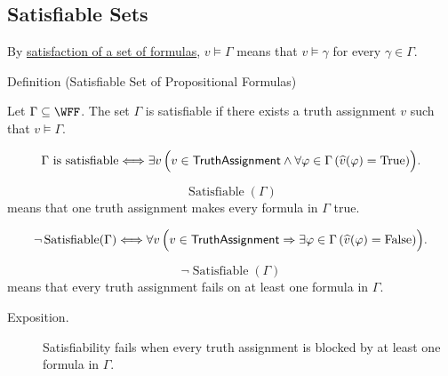 \subsection*{Satisfiable Sets}

\begin{remark*}[Recall]
By \hyperref[def:satisfaction-set-propositional-logic]{satisfaction of a set of
formulas}, \(v\models\Gamma\) means that \(v\models\gamma\) for every
\(\gamma\in\Gamma\).
\end{remark*}

\begin{definitionbox}{Definition (Satisfiable Set of Propositional Formulas)}
\begin{definition}
\label{def:satisfiable-set-of-propositional-formulas}
Let \(\Gamma\subseteq\WFF\). The set \(\Gamma\) is satisfiable if there exists a
truth assignment \(v\) such that \(v\models\Gamma\).
\end{definition}
\end{definitionbox}

\begin{remark*}
\[
\Gamma\text{ is satisfiable}
\Longleftrightarrow
\exists v\,\Bigl(v\in\mathsf{TruthAssignment}\land
\forall\varphi\in\Gamma\,(\widehat v(\varphi)=\mathrm{True})\Bigr).
\]
\end{remark*}

\begin{remark*}
\[
\operatorname{Satisfiable}(\Gamma)
\]
means that one truth assignment makes every formula in \(\Gamma\) true.
\end{remark*}

\begin{remark*}
\[
\neg\operatorname{Satisfiable}(\Gamma)
\Longleftrightarrow
\forall v\,\Bigl(v\in\mathsf{TruthAssignment}\Rightarrow
\exists\varphi\in\Gamma\,(\widehat v(\varphi)=\mathrm{False})\Bigr).
\]
\end{remark*}

\begin{remark*}
\[
\neg\operatorname{Satisfiable}(\Gamma)
\]
means that every truth assignment fails on at least one formula in \(\Gamma\).
\end{remark*}

\begin{remark*}
\begin{description}
  \item[Exposition.] Satisfiability fails when every truth assignment is blocked by at least one
formula in \(\Gamma\).
\end{description}
\end{remark*}

